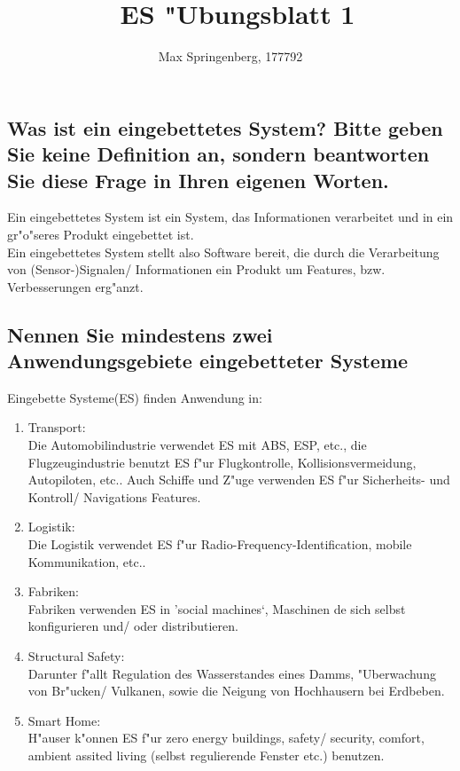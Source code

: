 \documentclass{article}
\author{Max Springenberg, 177792}
\title{\
    ES "Ubungsblatt 1
    }
\date{}
\begin{document}
\maketitle
\newpage

\subsection{Was ist ein eingebettetes System? Bitte geben Sie keine Definition 
    an, sondern beantworten Sie diese Frage in Ihren eigenen Worten.}

Ein eingebettetes System ist ein System, das Informationen verarbeitet und in 
    ein gr"o"seres Produkt eingebettet ist.\\
Ein eingebettetes System stellt also Software bereit, die durch die Verarbeitung
    von (Sensor-)Signalen/ Informationen ein Produkt um Features, bzw. 
    Verbesserungen erg"anzt.\\

\subsection{Nennen Sie mindestens zwei Anwendungsgebiete eingebetteter Systeme}

Eingebette Systeme(ES) finden Anwendung in:\\
\begin{enumerate}
    \item Transport:\\
          Die Automobilindustrie verwendet ES mit ABS, ESP, etc., die 
          Flugzeugindustrie benutzt ES f"ur Flugkontrolle, Kollisionsvermeidung,
          Autopiloten, etc.. Auch Schiffe und Z"uge verwenden ES f"ur 
          Sicherheits- und Kontroll/ Navigations Features.\\
    \item Logistik:\\
          Die Logistik verwendet ES f"ur Radio-Frequency-Identification,
          mobile Kommunikation, etc..\\
    \item Fabriken:\\
          Fabriken verwenden ES in 'social machines`, Maschinen de sich selbst 
          konfigurieren und/ oder distributieren.\\
    \item Structural Safety:\\
          Darunter f"allt Regulation des Wasserstandes eines Damms,
          "Uberwachung von Br"ucken/ Vulkanen, sowie die
          Neigung von Hochhausern bei Erdbeben.\\
    \item Smart Home:\\
          H"auser k"onnen ES f"ur zero energy buildings, safety/ security, 
          comfort, ambient assited living (selbst regulierende Fenster etc.)
          benutzen.\\
\end{enumerate}
\end{document}

